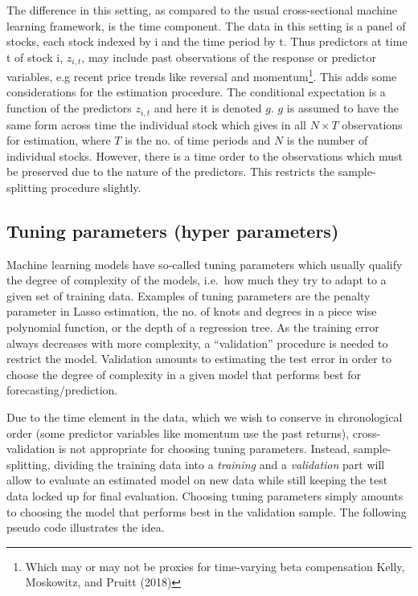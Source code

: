 \documentclass[]{article}
\let\rmarkdownfootnote\footnote%
\def\footnote{\protect\rmarkdownfootnote}
\begin{document}
The difference in this setting, as compared to the usual cross-sectional
machine learning framework, is the time component. The data in this
setting is a panel of stocks, each stock indexed by i and the time
period by t. Thus predictors at time t of stock i, \(z_{i,t}\), may
include past observations of the response or predictor variables, e.g
recent price trends like reversal and momentum\footnote{Which may or may
  not be proxies for time-varying beta compensation Kelly, Moskowitz,
  and Pruitt (2018)}. This adds some considerations for the estimation
procedure. The conditional expectation is a function of the predictors
\(z_{i,t}\) and here it is denoted \(g\). \(g\) is assumed to have the
same form across time the individual stock which gives in all
\(N\times T\) observations for estimation, where \(T\) is the no. of
time periods and \(N\) is the number of individual stocks. However,
there is a time order to the observations which must be preserved due to
the nature of the predictors. This restricts the sample-splitting
procedure slightly.

\hypertarget{tuning-parameters-hyper-parameters}{%
\subsection{Tuning parameters (hyper
parameters)}\label{tuning-parameters-hyper-parameters}}

Machine learning models have so-called tuning parameters which usually
qualify the degree of complexity of the models, i.e.~how much they try
to adapt to a given set of training data. Examples of tuning parameters
are the penalty parameter in Lasso estimation, the no. of knots and
degrees in a piece wise polynomial function, or the depth of a
regression tree. As the training error always decreases with more
complexity, a ``validation'' procedure is needed to restrict the model.
Validation amounts to estimating the test error in order to choose the
degree of complexity in a given model that performs best for
forecasting/prediction.

Due to the time element in the data, which we wish to conserve in
chronological order (some predictor variables like momentum use the past
returns), cross-validation is not appropriate for choosing tuning
parameters. Instead, sample-splitting, dividing the training data into a
\emph{training} and a \emph{validation} part will allow to evaluate an
estimated model on new data while still keeping the test data locked up
for final evaluation. Choosing tuning parameters simply amounts to
choosing the model that performs best in the validation sample. The
following pseudo code illustrates the idea.
\end{document}
